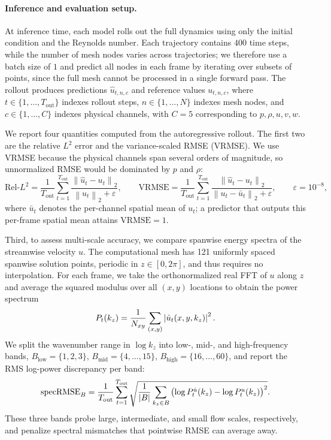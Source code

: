 \documentclass{article}
\begin{document}
\paragraph{Inference and evaluation setup.}
At inference time, each model rolls out the full dynamics using only the initial condition and the Reynolds number. Each trajectory contains \(400\) time steps, while the number of mesh nodes varies across trajectories; we therefore use a batch size of \(1\) and predict all nodes in each frame by iterating over subsets of points, since the full mesh cannot be processed in a single forward pass. The rollout produces predictions \(\hat{u}_{t,n,c}\) and reference values \(u_{t,n,c}\), where \(t \in \{1,\dots,T_{\mathrm{out}}\}\) indexes rollout steps, \(n \in \{1,\dots,N\}\) indexes mesh nodes, and \(c \in \{1,\dots,C\}\) indexes physical channels, with \(C=5\) corresponding to \(p,\rho,u,v,w\). 

\textcolor{revcolor}{We report four quantities computed from the autoregressive rollout. The first two are the relative \(L^2\) error and the variance-scaled RMSE (VRMSE). We use VRMSE because the physical channels span several orders of magnitude, so unnormalized RMSE would be dominated by \(p\) and \(\rho\):}
\[\mathrm{Rel}\text{-}L^2=\frac{1}{T_{\mathrm{out}}}\sum_{t=1}^{T_{\mathrm{out}}}\frac{\left\lVert \hat{u}_t-u_t \right\rVert_2}{\left\lVert u_t \right\rVert_2+\varepsilon}, \qquad \mathrm{VRMSE} = \frac{1}{T_{\mathrm{out}}} \sum_{t=1}^{T_{\mathrm{out}}} \frac{\left\lVert \hat{u}_t-u_t \right\rVert_2}{\left\lVert u_t-\bar{u}_t \right\rVert_2+\varepsilon}, \qquad \varepsilon=10^{-8},\]
where \(\bar{u}_t\) denotes the per-channel spatial mean of \(u_t\); a predictor that outputs this per-frame spatial mean attains \(\mathrm{VRMSE}=1\). 

\textcolor{revcolor}{Third, to assess multi-scale accuracy, we compare spanwise energy spectra of the streamwise velocity $u$. The computational mesh has 121 uniformly spaced spanwise solution points, periodic in $z \in [0, 2\pi]$, and thus requires no interpolation. For each frame, we take the orthonormalized real FFT of $u$ along $z$ and average the squared modulus over all $(x,y)$ locations to obtain the power spectrum}
\[\textcolor{revcolor}{P_t(k_z) = \frac{1}{N_{xy}} \sum_{(x,y)} \left|\hat{u}_{t}(x,y,k_z)\right|^2.}\]
\textcolor{revcolor}{We split the wavenumber range in $\log k_z$ into low-, mid-, and high-frequency bands, $B_{\mathrm{low}} = \{1,2,3\}$, $B_{\mathrm{mid}} = \{4,\dots,15\}$, $B_{\mathrm{high}} = \{16,\dots,60\}$, and report the RMS log-power discrepancy per band:}
\[
\textcolor{revcolor}{\mathrm{specRMSE}_{B} = \frac{1}{T_{\mathrm{out}}}\sum_{t=1}^{T_{\mathrm{out}}}\sqrt{\frac{1}{|B|}\sum_{k_z\in B}\left(\log P^{\hat{u}}_{t}(k_z)-\log P^{u}_{t}(k_z)\right)^2}.}
\]
These three bands probe large, intermediate, and small flow scales, respectively, and penalize spectral mismatches that pointwise RMSE can average away.
\end{document}
